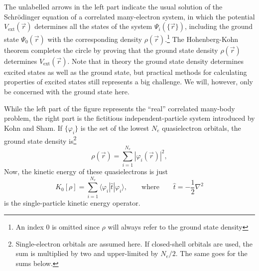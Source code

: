 \documentclass[11pt,bibliography=totoc,index=totoc]{scrbook}   %
\begin{document}
The unlabelled arrows in the left part indicate the usual solution of the Schrödinger equation of a correlated many-electron system, in which the potential $V_{\text{ext}}(\vec{r})$ determines all the states of the system $\Psi_i(\{\vec{r}\})$, including the ground state $\Psi_0(\vec{r})$ with the corresponding density $\rho(\vec{r})$.\footnote{An index 0 is omitted since $\rho$ will always refer to the ground state density} 
The Hohenberg-Kohn theorem completes the circle by proving that the ground state density $\rho(\vec{r})$ determines $V_{\text{ext}}(\vec{r})$.
Note that in theory the ground state density determines excited states as well as the ground state, but practical methods for calculating properties of excited states still represents a big challenge.\cite[136]{Martin:2004} We will, however, only be concerned with the ground state here.

While the left part of the figure represents the ``real'' correlated many-body problem, the right part is the fictitious independent-particle system introduced by Kohn and Sham. 
If $\{\varphi_i\}$ is the set of the lowest $N_e$ quasielectron orbitals, the ground state density is\footnote{Single-electron orbitals are assumed here. If closed-shell orbitals are used, the sum is multiplied by two and upper-limited by $N_e/2$. The same goes for the sums below.}
\begin{equation}
    \rho(\vec{r}) = \sum_{i=1}^{N_e} |\varphi_i(\vec{r})|^2,
    \label{eq:rho}
\end{equation}
Now, the kinetic energy of these quasielectrons is just
\begin{equation}
    K_0[\rho] = \sum_{i=1}^{N_e} \langle \varphi_i | \hat{t} | \varphi_i \rangle,\qquad\text{where}\qquad \hat{t} = -\frac12\nabla^2
  \label{eq:T0}
\end{equation}
is the single-particle kinetic energy operator.

\end{document}
